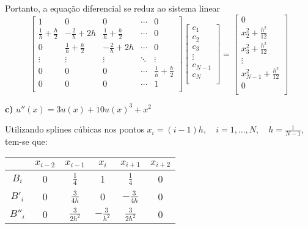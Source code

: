 \documentclass{article}
\begin{document}
    Portanto, a equação diferencial se reduz ao sistema linear
    $$ \begin{bmatrix}
        1 & 0 & 0 & \cdots & 0 \\
        \frac{1}{h}+\frac{h}{2} & -\frac{2}{h} + 2h & \frac{1}{h}+\frac{h}{2} & \cdots & 0 \\
        0 & \frac{1}{h}+\frac{h}{2} & -\frac{2}{h} + 2h & \cdots & 0 \\
        \vdots & \vdots & \vdots & \ddots & \vdots \\
        0 & 0 & 0 & \cdots & \frac{1}{h}+\frac{h}{2} \\
        0 & 0 & 0 & \cdots & 1 \\
    \end{bmatrix}\begin{bmatrix}
        c_1 \\ c_2 \\ c_3 \\ \vdots \\ c_{N-1} \\ c_N \\
    \end{bmatrix} = \begin{bmatrix}
        0 \\ x_2^2 + \frac{h^2}{12} \\ x_3^2 + \frac{h^2}{12} \\ \vdots \\ x_{N - 1}^2 + \frac{h^2}{12} \\ 0 \\
    \end{bmatrix}$$

    \textbf{c)} $u''(x) = 3u(x) + 10u(x)^3 + x^2$

    Utilizando splines cúbicas nos pontos $x_i = (i-1)h, \quad i = 1,\dots,N, \quad h = \frac{1}{N-1}$, tem-se que:
    \begin{table}[H]
        \centering
        \begin{tabular}{c|ccccc}
            & $x_{i-2}$ & $x_{i-1}$ & $x_i$ & $x_{i+1}$ & $x_{i+2}$\\
            \hline
            $B_i$ & 0 & $\frac{1}{4}$ & 1 & $\frac{1}{4}$ & 0\\
            $B'_i$ & 0 & $\frac{3}{4h}$ & 0 & $-\frac{3}{4h}$ & 0\\
            $B''_i$ & 0 & $\frac{3}{2h^2}$ & $-\frac{3}{h^2}$ & $\frac{3}{2h^2}$ & 0 \\
        \end{tabular}
    \end{table}
\end{document}
